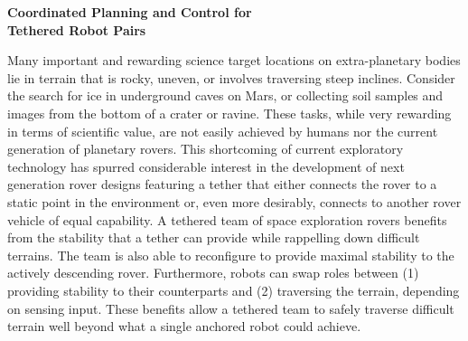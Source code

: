 \documentclass[12pt]{article}
\begin{document}
\newpage

\begin{center}
{\bf Coordinated Planning and Control for \\ Tethered Robot Pairs }

\end{center}
\vspace{-.1in}


 Many important and rewarding science
target locations on extra-planetary bodies lie in terrain that is
rocky, uneven, or involves traversing steep inclines. Consider the
search for ice in underground caves on Mars, or collecting soil
samples and images from the bottom of a crater or ravine.  These
tasks, while very rewarding in terms of scientific value, are not
easily achieved by humans nor the current generation of planetary
rovers. This shortcoming of current exploratory technology has spurred
considerable interest in the development of next generation rover
designs featuring a tether that either connects the rover to a static
point in the environment \cite{axel_planning, dante_results, 
dante_design} or, even more
desirably, connects to another rover vehicle of equal capability. A
tethered team of space exploration rovers benefits from the stability
that a tether can provide while rappelling down difficult terrains. 
The team is also 
able to reconfigure to provide maximal stability to the actively 
descending rover. Furthermore, robots can swap roles between (1)
providing stability to their counterparts and (2) traversing the terrain,
depending on sensing input. These benefits allow a tethered team to safely
traverse difficult terrain well beyond what a single anchored robot
could achieve.
\end{document}
